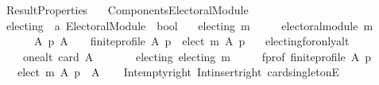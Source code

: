 %
\begin{isabellebody}%
%
%
\isadelimtheory
%
\endisadelimtheory
%
\isatagtheory
{}\isamarkupfalse%
\ Result{\isacharunderscore}{\kern0pt}Properties\isanewline
\ \ \ {\isachardoublequoteopen}{\isachardot}{\kern0pt}{\isachardot}{\kern0pt}{\isacharslash}{\kern0pt}Components{\isacharslash}{\kern0pt}Electoral{\isacharunderscore}{\kern0pt}Module{\isachardoublequoteclose}\isanewline
\isanewline
{}%
\endisatagtheory
{\isafoldtheory}%
%
\isadelimtheory
\isanewline
%
\endisadelimtheory
\isanewline
\isanewline
{}\isamarkupfalse%
\ electing\ {\isacharcolon}{\kern0pt}{\isacharcolon}{\kern0pt}\ {\isachardoublequoteopen}{\isacharprime}{\kern0pt}a\ Electoral{\isacharunderscore}{\kern0pt}Module\ {\isasymRightarrow}\ bool{\isachardoublequoteclose}\ \isanewline
\ \ {\isachardoublequoteopen}electing\ m\ {\isasymequiv}\isanewline
\ \ \ \ electoral{\isacharunderscore}{\kern0pt}module\ m\ {\isasymand}\isanewline
\ \ \ \ \ \ {\isacharparenleft}{\kern0pt}{\isasymforall}A\ p{\isachardot}{\kern0pt}\ {\isacharparenleft}{\kern0pt}A\ {\isasymnoteq}\ {\isacharbraceleft}{\kern0pt}{\isacharbraceright}{\kern0pt}\ {\isasymand}\ finite{\isacharunderscore}{\kern0pt}profile\ A\ p{\isacharparenright}{\kern0pt}\ {\isasymlongrightarrow}\ elect\ m\ A\ p\ {\isasymnoteq}\ {\isacharbraceleft}{\kern0pt}{\isacharbraceright}{\kern0pt}{\isacharparenright}{\kern0pt}{\isachardoublequoteclose}\isanewline
\isanewline
{}\isamarkupfalse%
\ electing{\isacharunderscore}{\kern0pt}for{\isacharunderscore}{\kern0pt}only{\isacharunderscore}{\kern0pt}alt{\isacharcolon}{\kern0pt}\isanewline
\ \ \isanewline
\ \ \ \ one{\isacharunderscore}{\kern0pt}alt{\isacharcolon}{\kern0pt}\ {\isachardoublequoteopen}card\ A\ {\isacharequal}{\kern0pt}\ {}{\isachardoublequoteclose}\ \isanewline
\ \ \ \ electing{\isacharcolon}{\kern0pt}\ {\isachardoublequoteopen}electing\ m{\isachardoublequoteclose}\ \isanewline
\ \ \ \ f{\isacharunderscore}{\kern0pt}prof{\isacharcolon}{\kern0pt}\ {\isachardoublequoteopen}finite{\isacharunderscore}{\kern0pt}profile\ A\ p{\isachardoublequoteclose}\isanewline
\ \ \ {\isachardoublequoteopen}elect\ m\ A\ p\ {\isacharequal}{\kern0pt}\ A{\isachardoublequoteclose}\isanewline
%
\isadelimproof
\ \ %
\endisadelimproof
%
\isatagproof
{}\isamarkupfalse%
\ Int{\isacharunderscore}{\kern0pt}empty{\isacharunderscore}{\kern0pt}right\ Int{\isacharunderscore}{\kern0pt}insert{\isacharunderscore}{\kern0pt}right\ card{\isacharunderscore}{\kern0pt}{}{\isacharunderscore}{\kern0pt}singletonE\isanewline

\end{isabellebody}

